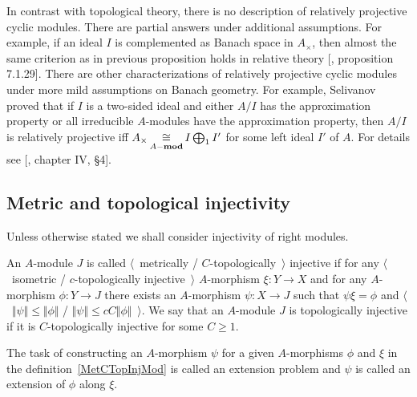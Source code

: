 In contrast with topological theory, there is no description of relatively
projective cyclic modules. There are partial answers under additional
assumptions. For example, if an ideal $I$ is complemented as Banach space in
$A_\times$, then almost the same criterion as in previous proposition holds in
relative theory [\cite{HelBanLocConvAlg}, proposition 7.1.29]. There are other
characterizations of relatively projective cyclic modules under more mild
assumptions on Banach geometry. For example, Selivanov proved that if $I$ is a
two-sided ideal and either $A/I$ has the approximation property or all
irreducible $A$-modules have the approximation property, then $A/I$ is
relatively projective iff $A_\times\mathop{\mathbin{\cong}}\limits_{A-\mathbf{mod}}I\bigoplus_1 I'$ for
some left ideal $I'$ of $A$. For details see [\cite{HelHomolBanTopAlg}, chapter
IV, \S 4].




\subsection{
    Metric and topological injectivity
}\label{SubSectionMetricAndTopologicalInjectivity}

Unless otherwise stated we shall consider injectivity of right modules.

\begin{definition}\label{MetCTopInjMod} 
An $A$-module $J$ is 
called $\langle$~metrically / $C$-topologically~$\rangle$ injective if for any 
$\langle$~isometric / $c$-topologically injective~$\rangle$
$A$-morphism $\xi:Y\to X$ and for any $A$-morphism $\phi:Y\to J$ 
there exists an $A$-morphism $\psi:X\to J$ such that $\psi\xi=\phi$  and
$\langle$~$\Vert\psi\Vert\leq\Vert\phi\Vert$ / 
$\Vert \psi\Vert\leq c C\Vert\phi\Vert$~$\rangle$. We say that an $A$-module 
$J$ is topologically injective if it is $C$-topologically injective for 
some $C\geq 1$.
\end{definition}

The task of constructing an $A$-morphism $\psi$ for a given $A$-morphisms $\phi$ 
and $\xi$ in the definition~\ref{MetCTopInjMod} is called an extension problem 
and $\psi$ is called an extension of $\phi$ along $\xi$.


